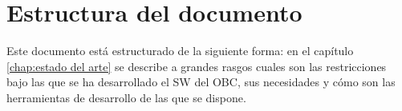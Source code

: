 \section{Estructura del documento}
\label{sec:estructura doc}

Este documento está estructurado de la siguiente forma: en el capítulo
\ref{chap:estado del arte} se describe a grandes rasgos cuales son las
restricciones bajo las que se ha desarrollado el SW del OBC, sus necesidades
y cómo son las herramientas de desarrollo de las que se dispone.


